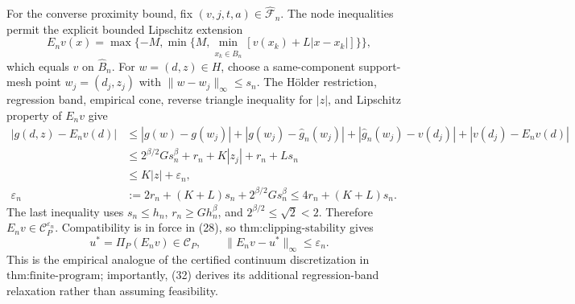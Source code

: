 For the converse proximity bound, fix \((v,j,t,a)\in\widehat{\mathscr F}_n\). The node inequalities permit the explicit bounded Lipschitz extension
\[
 E_nv(x)=\max\{-M,\min\{M,\min_{x_k\in\widehat B_n}[v(x_k)+L|x-x_k|]\}\},
\]
which equals \(v\) on \(\widehat B_n\). For \(w=(d,z)\in H\), choose a same-component support-mesh point \(w_j=(d_j,z_j)\) with \(\|w-w_j\|_\infty\leq s_n\). The H\"older restriction, regression band, empirical cone, reverse triangle inequality for \(|z|\), and Lipschitz property of \(E_nv\) give
\[
\begin{aligned}
 |g(d,z)-E_nv(d)|
 &\leq |g(w)-g(w_j)|+|g(w_j)-\widehat g_n(w_j)|
      +|\widehat g_n(w_j)-v(d_j)|+|v(d_j)-E_nv(d)|\\
 &\leq 2^{\beta/2}Gs_n^\beta+r_n+K|z_j|+r_n+Ls_n\\
 &\leq K|z|+\varepsilon_n,\\
 \varepsilon_n&:=2r_n+(K+L)s_n+2^{\beta/2}Gs_n^\beta
 \leq4r_n+(K+L)s_n.                                             \tag{32}
\end{aligned}
\]
The last inequality uses \(s_n\leq h_n\), \(r_n\geq Gh_n^\beta\), and \(2^{\beta/2}\leq\sqrt2<2\). Therefore \(E_nv\in\mathcal C_P^{\varepsilon_n}\). Compatibility is in force in (28), so \(\text{thm:clipping-stability}\) gives
\[
 u^*=\Pi_P(E_nv)\in\mathcal C_P,
 \qquad \|E_nv-u^*\|_\infty\leq\varepsilon_n.                   \tag{33}
\]
This is the empirical analogue of the certified continuum discretization in \(\text{thm:finite-program}\); importantly, (32) derives its additional regression-band relaxation rather than assuming feasibility.

